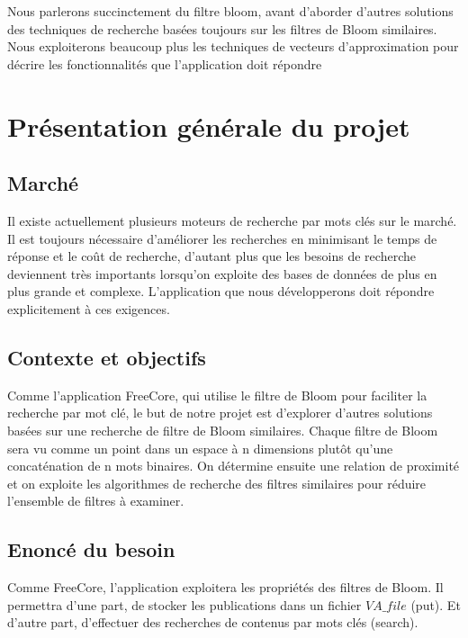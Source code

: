 \documentclass[a4paper,12pt]{report}
\begin{document}
Nous parlerons succinctement du filtre bloom, avant d’aborder d’autres solutions des techniques de recherche basées toujours sur les filtres de Bloom similaires. Nous exploiterons beaucoup plus les techniques de vecteurs d’approximation pour décrire les fonctionnalités que l’application doit répondre

\chapter{Présentation générale du projet}
	\section{Marché}
		Il existe actuellement plusieurs moteurs de recherche par mots clés sur le marché. Il est toujours nécessaire d’améliorer les recherches en minimisant le temps de réponse et le coût de recherche, d’autant plus que les besoins de recherche deviennent très importants lorsqu’on exploite des bases de données de plus en plus grande et complexe. L’application que nous développerons doit répondre explicitement à ces exigences.
		
	\section{Contexte et objectifs}
		Comme l’application FreeCore, qui utilise le filtre de Bloom pour faciliter la recherche par mot clé, le but de notre projet est d'explorer d’autres solutions basées sur une recherche de filtre de Bloom similaires.  Chaque filtre  de  Bloom  sera vu  comme  un  point  dans  un  espace à n dimensions  plutôt  qu'une  concaténation de  n mots binaires. On détermine ensuite une relation de proximité et on exploite les algorithmes de recherche des filtres similaires pour réduire l'ensemble de filtres à examiner.
		
	\section{Enoncé du besoin}
		Comme FreeCore, l’application exploitera les propriétés des filtres de Bloom. Il  permettra d’une part, de stocker les publications dans un fichier $VA\_file$ (put). Et d’autre part, d’effectuer des recherches de contenus par mots clés (search).
\end{document}
